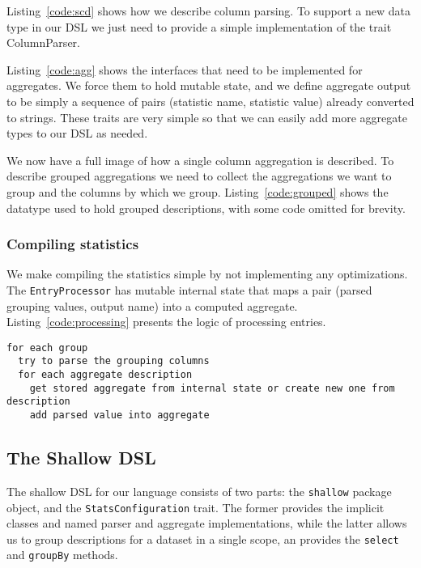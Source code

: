 Listing~\ref{code:scd} shows how we describe column parsing.
To support a new data type in our DSL we just need to provide a simple implementation of the trait ColumnParser.

Listing~\ref{code:agg} shows the interfaces that need to be implemented for aggregates.
We force them to hold mutable state, and we define aggregate output to be simply a sequence of pairs (statistic name, statistic value) already converted to strings.
These traits are very simple so that we can easily add more aggregate types to our DSL as needed.

We now have a full image of how a single column aggregation is described.
To describe grouped aggregations we need to collect the aggregations we want to group and the columns by which we group.
Listing~\ref{code:grouped} shows the datatype used to hold grouped descriptions, with some code omitted for brevity.

\subsubsection{Compiling statistics}
We make compiling the statistics simple by not implementing any optimizations.
The \texttt{EntryProcessor} has mutable internal state that maps a pair (parsed grouping values, output name) into a computed aggregate.
Listing~\ref{code:processing} presents the logic of processing entries.

\begin{lstlisting}[caption=Processing entries, label=code:processing,float,floatplacement=H]
for each group
  try to parse the grouping columns
  for each aggregate description
    get stored aggregate from internal state or create new one from description
    add parsed value into aggregate
\end{lstlisting}

\subsection{The Shallow DSL}

The shallow DSL for our language consists of two parts: the \texttt{shallow} package object, and the \texttt{StatsConfiguration} trait.
The former provides the implicit classes and named parser and aggregate implementations, while the latter allows us to group descriptions for a dataset in a single scope, an provides the  \texttt{select} and \texttt{groupBy} methods.

